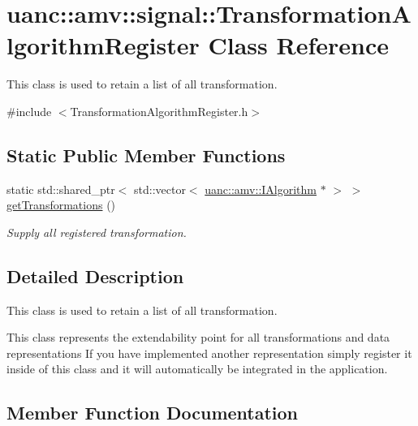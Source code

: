\hypertarget{classuanc_1_1amv_1_1signal_1_1_transformation_algorithm_register}{}\section{uanc\+:\+:amv\+:\+:signal\+:\+:Transformation\+Algorithm\+Register Class Reference}
\label{classuanc_1_1amv_1_1signal_1_1_transformation_algorithm_register}


This class is used to retain a list of all transformation.  




{\ttfamily \#include $<$Transformation\+Algorithm\+Register.\+h$>$}

\subsection*{Static Public Member Functions}
\begin{DoxyCompactItemize}
\item 
static std\+::shared\+\_\+ptr$<$ std\+::vector$<$ \hyperlink{classuanc_1_1amv_1_1_i_algorithm}{uanc\+::amv\+::\+I\+Algorithm} $\ast$ $>$ $>$ \hyperlink{classuanc_1_1amv_1_1signal_1_1_transformation_algorithm_register_ad03dc4e23a840670d57ef3d6d1bfb4b9}{get\+Transformations} ()
\begin{DoxyCompactList}\small\item\em Supply all registered transformation. \end{DoxyCompactList}\end{DoxyCompactItemize}


\subsection{Detailed Description}
This class is used to retain a list of all transformation. 

This class represents the extendability point for all transformations and data representations If you have implemented another representation simply register it inside of this class and it will automatically be integrated in the application. 

\subsection{Member Function Documentation}
